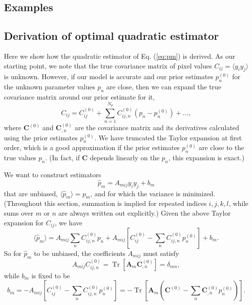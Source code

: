 \documentclass{article}
\newcommand{\mat}[1]{\mathbf{#1}}
\DeclareMathOperator{\Tr}{Tr}
\begin{document}
\subsection{Examples}

\subsection{Derivation of optimal quadratic estimator}
\label{sec:derivation}

Here we show how the quadratic estimator of Eq. (\ref{eq:pm}) is derived.  As
our starting point, we note that the true covariance matrix of pixel values
$C_{ij} = \langle y_i y_j \rangle$ is unknown.  However, if our model is
accurate and our prior estimates $p_n^{(0)}$ for the unknown parameter values
$p_n$ are close, then we can expand the true covariance matrix around our prior
estimate for it,
\begin{equation}
    C_{ij} = C_{ij}^{(0)} + \sum_{n=1}^{N_p} C_{ij,n}^{(0)} (p_n - p_n^{(0)}) + \dots,
\end{equation}
where $\mat{C}^{(0)}$ and $\mat{C}_{,n}^{(0)}$ are the covariance matrix and
its derivatives calculated using the prior estimates $p_n^{(0)}$.  We have
truncated the Taylor expansion at first order, which is a good approximation if
the prior estimates $p_n^{(0)}$ are close to the true values $p_n$.  (In fact,
if $\mat{C}$ depends linearly on the $p_n$, this expansion is exact.)

We want to construct estimators
\begin{equation}
    \hat{p}_m = A_{mij} y_i y_j + b_m
\end{equation}
that are unbiased, $\langle \hat{p}_m \rangle = p_m$, and for which the
variance is minimized.  (Throughout this section, summation is implied for
repeated indices $i,j,k,l$, while sums over $m$ or $n$ are always written out
explicitly.) Given the above Taylor expansion for $C_{ij}$, we have
\begin{equation}
    \langle \hat{p}_m \rangle 
        = A_{mij} \sum_n C_{ij,n}^{(0)} p_n + A_{mij} \left[C_{ij}^{(0)} - \sum_n C_{ij,n}^{(0)} p_n^{(0)}\right] + b_m.
\end{equation}
So for $\hat{p}_m$ to be unbiased, the coefficients $A_{mij}$ must satisfy
\begin{equation}
    \label{eq:unbias}
    A_{mij} C_{ij,n}^{(0)} = \Tr\left[\mat{A}_m \mat{C}_{,n}^{(0)}\right] = \delta_{mn},
\end{equation}
while $b_m$ is fixed to be
\begin{equation}
    b_m = -A_{mij} \left[C_{ij}^{(0)} - \sum_n C_{ij,n}^{(0)} p_n^{(0)}\right] = -\Tr\left[\mat{A}_m \left(\mat{C}^{(0)} - \sum_n \mat{C}_{,n}^{(0)} p_n^{(0)}\right)\right].
\end{equation}
\end{document}

